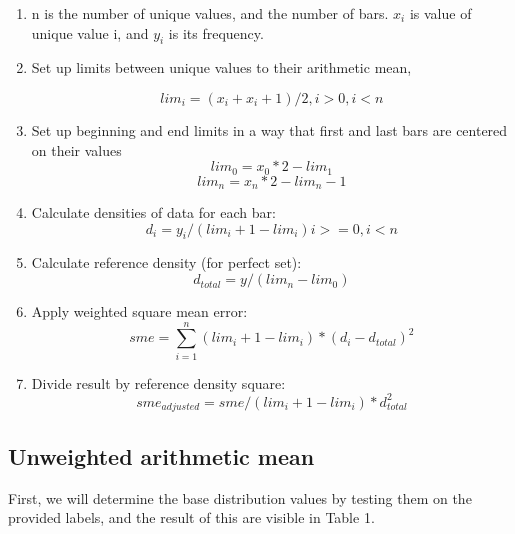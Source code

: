 \documentclass[10pt, a4paper]{article}
\begin{document}
\begin{enumerate}
\item n is the number of unique values, and the number of bars. $x_i$ is value of unique value i, and $y_i$ is its frequency.

\item Set up limits between unique values to their arithmetic mean,

\begin{equation}\label{eq:bars}
lim_i = (x_i + x_i+1)/2, i>0,i<n
\end{equation}

\item Set up beginning and end limits in a way that first and last bars are centered on their values
\begin{equation}\label{eq:lim_0}
lim_0 = x_0*2 - lim_1
\end{equation}
\begin{equation}\label{eq:lim_n}
lim_n = x_n*2 - lim_n-1
\end{equation}

\item Calculate densities of data for each bar:
\begin{equation}\label{eq:lim_n}
d_i = y_i/(lim_i+1 - lim_i) i>=0,i<n
\end{equation}

\item Calculate reference density (for perfect set):
\begin{equation}\label{eq:lim_n}
d_{total} = y/(lim_n - lim_0)
\end{equation}

\item Apply weighted square mean error:
\begin{equation}\label{eq:lim_n}
sme = \sum_{i=1}^n (lim_i+1 - lim_i)*(d_i-d_{total})^2
\end{equation}


\item Divide result by reference density square:
\begin{equation}\label{eq:lim_n}
sme_{adjusted} = sme/(lim_i+1 - lim_i)*d_{total}^2
\end{equation}
\end{enumerate}

\subsection{Unweighted arithmetic mean}
First, we will determine the base distribution values by testing them on the provided labels, and the result of this are visible in Table 1.
\end{document}
